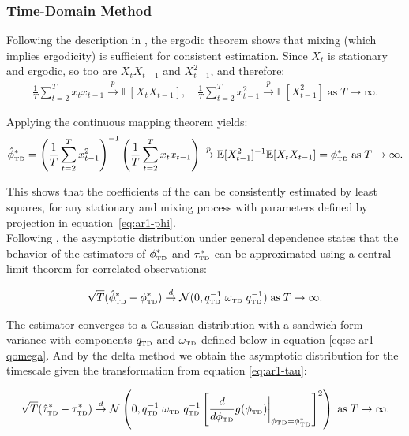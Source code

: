 \documentclass[docs/main.tex]{subfiles}
\begin{document}
\subsubsection{Time-Domain Method}
Following the description in \citet[Theorem~14.29]{hansen_econometrics_2022}, the ergodic theorem shows that mixing (which implies ergodicity) is sufficient for consistent estimation. Since $X_t$ is stationary and ergodic, so too are $X_t X_{t-1}$ and $X_{t-1}^2$, and therefore:
\begin{align}
    \frac{1}{T} \sum_{t=2}^T x_t x_{t-1} \overset{p}{\to} \mathbb{E}[X_t X_{t-1}],\quad
    \frac{1}{T} \sum_{t=2}^T x_{t-1}^2 \overset{p}{\to} \mathbb{E}[X_{t-1}^2] \;\text{as}\;T\to\infty.
\end{align}

\noindent Applying the continuous mapping theorem yields:
\begin{align}
    \hat{\phi}^*_{\scriptscriptstyle\text{TD}} = \left(\frac{1}{T} \sum_{t=2}^T x_{t-1}^2\right)^{-1} \left( \frac{1}{T} \sum_{t=2}^T x_t x_{t-1}\right) \overset{p}{\to} \mathbb{E}[X_{t-1}^2]^{-1}\mathbb{E}[X_t X_{t-1}] = \phi_{\scriptscriptstyle\text{TD}}^* \;\text{as}\;T\to\infty.
\end{align}

\noindent This shows that the coefficients of the  can be consistently estimated by least squares, for any stationary and mixing process with parameters defined by projection in equation~\eqref{eq:ar1-phi}.\\

Following \citet[Theorem~14.33]{hansen_econometrics_2022}, the asymptotic distribution under general dependence states that the behavior of the estimators of $\phi_{\scriptscriptstyle\text{TD}}^*$ and $\tau_{\scriptscriptstyle\text{TD}}^*$ can be approximated using a central limit theorem for correlated observations:

\begin{align}\label{eq:ar1-phi-clt}
    \sqrt{T}(\hat{\phi}^*_{\scriptscriptstyle\text{TD}} - \phi_{\scriptscriptstyle\text{TD}}^*) \overset{d}{\to} \mathcal{N}(0, q_{\scriptscriptstyle\text{TD}}^{-1}\; \omega_{\scriptscriptstyle\text{TD}} \; q_{\scriptscriptstyle\text{TD}}^{-1})\;\text{as}\;T\to\infty.
\end{align}

\noindent The estimator converges to a Gaussian distribution with a sandwich-form variance with components $q_{\scriptscriptstyle\text{TD}}$ and $\omega_{\scriptscriptstyle\text{TD}}$ defined below in equation \eqref{eq:se-ar1-qomega}. And by the delta method we obtain the asymptotic distribution for the timescale given the transformation from equation \eqref{eq:ar1-tau}:

\begin{align}
    \sqrt{T}(\hat{\tau}^*_{\scriptscriptstyle\text{TD}} - \tau_{\scriptscriptstyle\text{TD}}^*) \overset{d}{\to} \mathcal{N}\left(0, q_{\scriptscriptstyle\text{TD}}^{-1}\; \omega_{\scriptscriptstyle\text{TD}} \; q_{\scriptscriptstyle\text{TD}}^{-1} \left[\frac{d}{d\phi_{\scriptscriptstyle\text{TD}}} g(\phi_{\scriptscriptstyle\text{TD}})\bigg|_{\phi_{\scriptscriptstyle\text{TD}}=\phi_{\scriptscriptstyle\text{TD}}^*}\right]^2\right)\;\text{as}\;T\to\infty.
\end{align}
\end{document}
